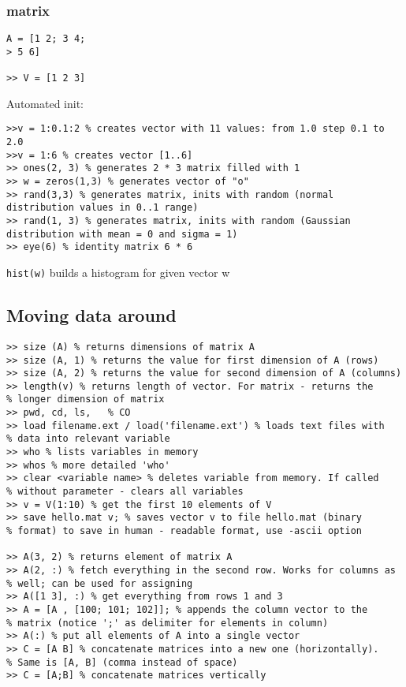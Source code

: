 \documentclass{scrartcl}
\begin{document}
\subsubsection {matrix}
\begin{verbatim}
A = [1 2; 3 4;
> 5 6]

>> V = [1 2 3]
\end{verbatim}
Automated init:
\begin{verbatim}
>>v = 1:0.1:2 % creates vector with 11 values: from 1.0 step 0.1 to 2.0
>>v = 1:6 % creates vector [1..6]
>> ones(2, 3) % generates 2 * 3 matrix filled with 1
>> w = zeros(1,3) % generates vector of "o"
>> rand(3,3) % generates matrix, inits with random (normal
distribution values in 0..1 range)
>> rand(1, 3) % generates matrix, inits with random (Gaussian
distribution with mean = 0 and sigma = 1)
>> eye(6) % identity matrix 6 * 6
\end{verbatim}
\verb!hist(w)! builds a histogram for given vector w

\subsection {Moving data around}
\label{5-2}
\begin{verbatim}
>> size (A) % returns dimensions of matrix A
>> size (A, 1) % returns the value for first dimension of A (rows)
>> size (A, 2) % returns the value for second dimension of A (columns)
>> length(v) % returns length of vector. For matrix - returns the
% longer dimension of matrix
>> pwd, cd, ls,   % CO
>> load filename.ext / load('filename.ext') % loads text files with
% data into relevant variable
>> who % lists variables in memory
>> whos % more detailed 'who'
>> clear <variable name> % deletes variable from memory. If called
% without parameter - clears all variables
>> v = V(1:10) % get the first 10 elements of V
>> save hello.mat v; % saves vector v to file hello.mat (binary
% format) to save in human - readable format, use -ascii option

>> A(3, 2) % returns element of matrix A
>> A(2, :) % fetch everything in the second row. Works for columns as
% well; can be used for assigning
>> A([1 3], :) % get everything from rows 1 and 3
>> A = [A , [100; 101; 102]]; % appends the column vector to the
% matrix (notice ';' as delimiter for elements in column)
>> A(:) % put all elements of A into a single vector
>> C = [A B] % concatenate matrices into a new one (horizontally).
% Same is [A, B] (comma instead of space)
>> C = [A;B] % concatenate matrices vertically 
\end{verbatim}
\end{document}
